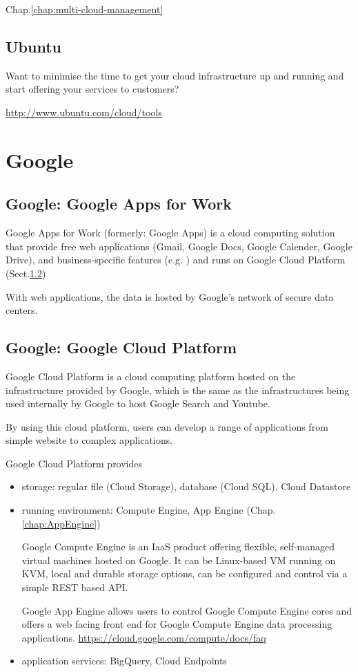 Chap.\ref{chap:multi-cloud-management} 

\subsection{Ubuntu}

Want to minimise the time to get your cloud infrastructure up and running and
start offering your services to customers? 


\url{http://www.ubuntu.com/cloud/tools}
 
\section{Google}

\subsection{Google: Google Apps for Work}
\label{sec:google_apps-work}

Google Apps for Work (formerly: Google Apps) is a cloud computing
solution that provide free web applications (Gmail, Google Docs, Google
Calender, Google Drive), and business-specific features (e.g. ) and runs on
Google Cloud Platform (Sect.\ref{sec:google_cloud-platform})

With web applications, the data is hosted by Google's network of secure data
centers.



\subsection{Google: Google Cloud Platform}
\label{sec:google_cloud-platform}

Google Cloud Platform is a cloud computing platform hosted on the infrastructure
provided by Google, which is the same as the infrastructures being used
internally by Google to host Google Search and Youtube. 

By using this cloud platform, users can develop a range of applications from
simple website to complex applications. 

Google Cloud Platform provides
\begin{itemize}
  \item storage: regular file (Cloud Storage), database (Cloud SQL), Cloud
  Datastore
  
  \item running environment: Compute Engine, App Engine (Chap.\ref{chap:AppEngine})
  
  Google Compute Engine is an IaaS product offering flexible, self-managed
  virtual machines hosted on Google. It can be Linux-based VM running on KVM,
  local and durable storage options, can be configured and control via a simple
  REST based API.
  
  Google App Engine allows users to control Google Compute Engine cores and
  offers a web facing front end for Google Compute Engine data processing
  applications. \url{https://cloud.google.com/compute/docs/faq}
  
  \item application services: BigQuery, Cloud Endpoints
\end{itemize}

